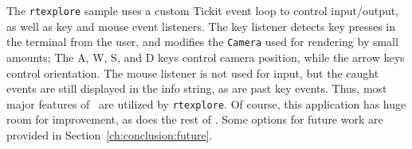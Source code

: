 The \texttt{rtexplore} sample uses a custom Tickit event loop to control input/output, as well as key and mouse event listeners.
The key listener detects key presses in the terminal from the user, and modifies the \texttt{Camera} used for rendering by small amounts;
The A, W, S, and D keys control camera position, while the arrow keys control orientation.
The mouse listener is not used for input, but the caught events are still displayed in the info string, as are past key events.
Thus, most major features of \name\ are utilized by \texttt{rtexplore}.
Of course, this application has huge room for improvement, as does the rest of \name.
Some options for future work are provided in Section~\ref{ch:conclusion:future}.
